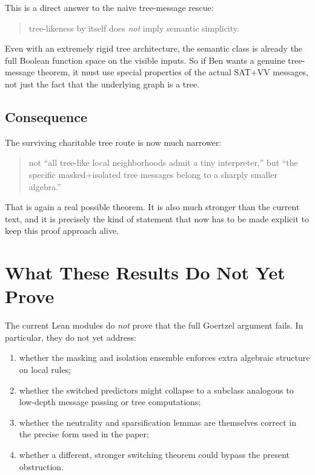 \documentclass[11pt]{article}
\theoremstyle{remark}
\begin{document}
This is a direct answer to the naive tree-message rescue:

\begin{quote}
tree-likeness by itself does \emph{not} imply semantic simplicity.
\end{quote}

Even with an extremely rigid tree architecture, the semantic class is already the full Boolean
function space on the visible inputs.  So if Ben wants a genuine tree-message theorem, it must use
special properties of the actual SAT+VV messages, not just the fact that the underlying graph is a
tree.

\subsection{Consequence}

The surviving charitable tree route is now much narrower:
\begin{quote}
not ``all tree-like local neighborhoods admit a tiny interpreter,''
but ``the specific masked+isolated tree messages belong to a sharply smaller algebra.''
\end{quote}

That is again a real possible theorem.  It is also much stronger than the current text, and it is
precisely the kind of statement that now has to be made explicit to keep this proof approach alive.

\section{What These Results Do Not Yet Prove}

The current Lean modules do \emph{not} prove that the full Goertzel argument fails.  In particular,
they do not yet address:
\begin{enumerate}[leftmargin=1.5em]
  \item whether the masking and isolation ensemble enforces extra algebraic structure on local rules;
  \item whether the switched predictors might collapse to a subclass analogous to low-depth message
  passing or tree computations;
  \item whether the neutrality and sparsification lemmas are themselves correct in the precise form
  used in the paper;
  \item whether a different, stronger switching theorem could bypass the present obstruction.
\end{enumerate}
\end{document}
